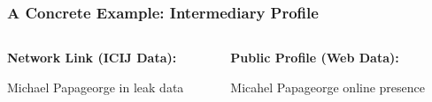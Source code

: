 \documentclass{beamer}
\begin{document}
\begin{frame}
    \frametitle{A Concrete Example: Intermediary Profile}

    \begin{columns}[T] %
        \begin{column}{0.5\textwidth}
            \textbf{Network Link (ICIJ Data):}
            \begin{center}
                \scriptsize{Michael Papageorge in leak data}
            \end{center}
        \end{column}
        \begin{column}{0.5\textwidth}
            \textbf{Public Profile (Web Data):}
             \begin{center}
                \scriptsize{Micahel Papageorge online presence}
            \end{center}
        \end{column}
    \end{columns}

\end{frame}
\end{document}
